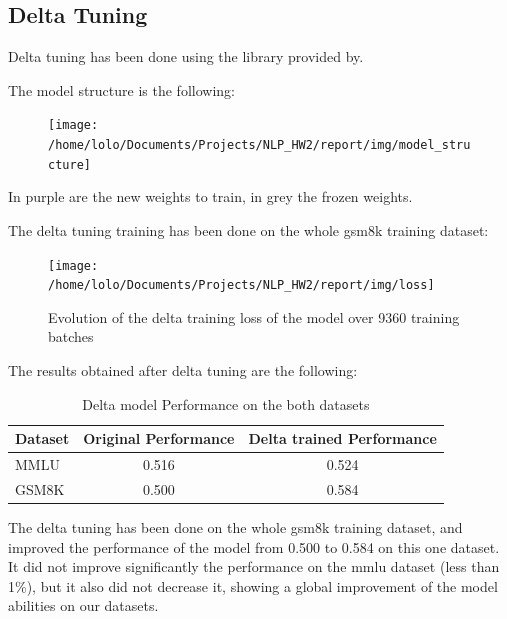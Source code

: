 \documentclass{article}
\begin{document}
        \subsection{Delta Tuning}\label{subsec:delta-tuning}

    Delta tuning has been done using the library provided by\cite{hu2023opendelta}.

        The model structure is the following:
        \begin{figure}[H]
            \centering
            \texttt{[image: /home/lolo/Documents/Projects/NLP\_HW2/report/img/model\_structure]}
            \caption{}
            \label{fig:Model}
        \end{figure}
        In purple are the new weights to train, in grey the frozen weights.

        The delta tuning training has been done on the whole gsm8k training dataset:

        \begin{figure}[H]
            \centering
            \texttt{[image: /home/lolo/Documents/Projects/NLP\_HW2/report/img/loss]}
            \caption{Evolution of the delta training loss of the model over 9360 training batches}
            \label{fig:Loss}
        \end{figure}

        The results obtained after delta tuning are the following:
        \begin{table}[htbp]
            \centering
            \caption{Delta model Performance on the both datasets}
            \label{tab:delta_performance}
            \begin{tabular}{lcc}
              \toprule
              \textbf{Dataset} & \textbf{Original Performance} & \textbf{Delta trained Performance} \\
              \midrule
              MMLU & 0.516 & 0.524 \\
              GSM8K & 0.500 & 0.584 \\
              \bottomrule
            \end{tabular}
          \end{table}

    The delta tuning has been done on the whole gsm8k training dataset, and improved the performance of the model from 0.500 to 0.584 on this one dataset.
    It did not improve significantly the performance on the mmlu dataset (less than 1\%), but it also did not decrease it, showing a global improvement of the model abilities on our datasets.
\end{document}
